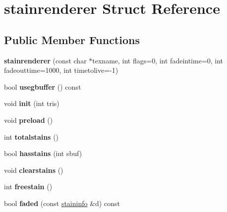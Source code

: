 \hypertarget{structstainrenderer}{}\section{stainrenderer Struct Reference}
\label{structstainrenderer}
\subsection*{Public Member Functions}
\begin{DoxyCompactItemize}
\item 
\mbox{\label{structstainrenderer_a8b1460d4b6f4c49fe69cadf7a2142547}} 
{\bfseries stainrenderer} (const char $\ast$texname, int flags=0, int fadeintime=0, int fadeouttime=1000, int timetolive=-\/1)
\item 
\mbox{\label{structstainrenderer_a395d93b22bba104adbcc48555a0edaf3}} 
bool {\bfseries usegbuffer} () const
\item 
\mbox{\label{structstainrenderer_abb81eb2063beb22afbfec8b3aa8e3e4a}} 
void {\bfseries init} (int tris)
\item 
\mbox{\label{structstainrenderer_a031f1359671ce0724cfa738375a8507f}} 
void {\bfseries preload} ()
\item 
\mbox{\label{structstainrenderer_a15085b7a7a4d1a08e9c3bb4c6535227b}} 
int {\bfseries totalstains} ()
\item 
\mbox{\label{structstainrenderer_af08707c1a7f329330945a1defbae69ed}} 
bool {\bfseries hasstains} (int sbuf)
\item 
\mbox{\label{structstainrenderer_a2031153c1eb97c334d98c0613224b425}} 
void {\bfseries clearstains} ()
\item 
\mbox{\label{structstainrenderer_ab1336a0207d225f67537aa00c7050c18}} 
int {\bfseries freestain} ()
\item 
\mbox{\label{structstainrenderer_a7103443287966274185977840259f00f}} 
bool {\bfseries faded} (const \hyperlink{structstaininfo}{staininfo} \&d) const

\end{DoxyCompactItemize}
